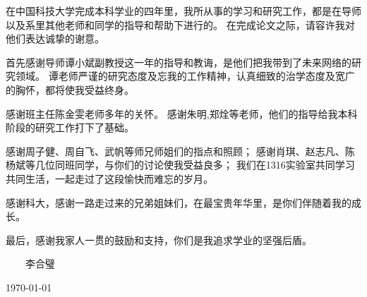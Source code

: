 ﻿
\begin{thanks}


在中国科技大学完成本科学业的四年里，我所从事的学习和研究工作，都是在导师以及系里其他老师和同学的指导和帮助下进行的。
在完成论文之际，请容许我对他们表达诚挚的谢意。

首先感谢导师谭小斌副教授这一年的指导和教诲，是他们把我带到了未来网络的研究领域。
谭老师严谨的研究态度及忘我的工作精神，认真细致的治学态度及宽广的胸怀，都将使我受益终身。

感谢班主任陈金雯老师多年的关怀。
感谢朱明,郑烇等老师，他们的指导给我本科阶段的研究工作打下了基础。

感谢周子健、周自飞、武帆等师兄师姐们的指点和照顾；
感谢肖琪、赵志凡、陈杨斌等几位同班同学，与你们的讨论使我受益良多；
我们在1316实验室共同学习共同生活，一起走过了这段愉快而难忘的岁月。

感谢科大，感谢一路走过来的兄弟姐妹们，在最宝贵年华里，是你们伴随着我的成长。

最后，感谢我家人一贯的鼓励和支持，你们是我追求学业的坚强后盾。

\vskip 18pt

\begin{flushright}

~~~~李合璧~~~~

\today

\end{flushright}

\end{thanks}

